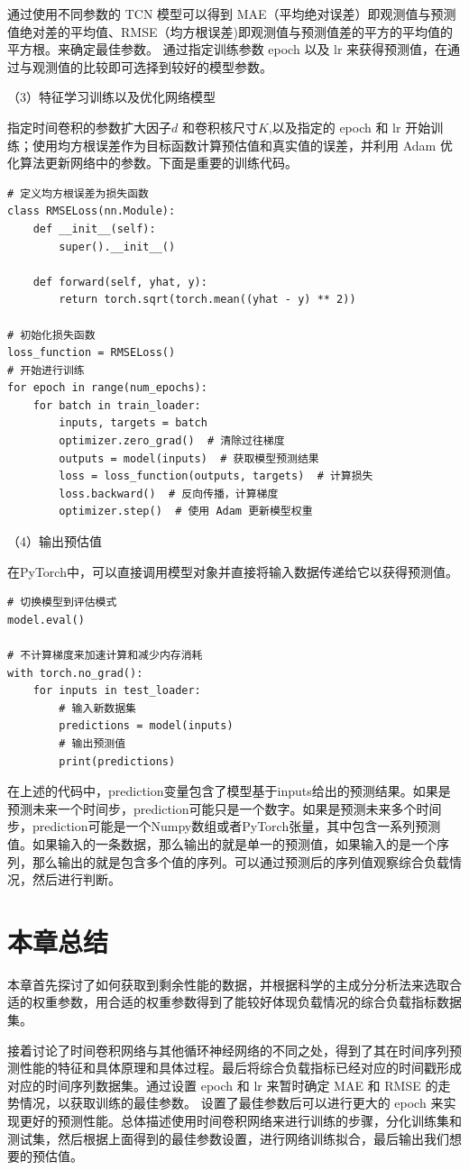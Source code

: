 通过使用不同参数的 TCN 模型可以得到 MAE（平均绝对误差）即观测值与预测值绝对差的平均值、RMSE（均方根误差)即观测值与预测值差的平方的平均值的平方根。来确定最佳参数。 通过指定训练参数 epoch 以及 lr 来获得预测值，在通过与观测值的比较即可选择到较好的模型参数。

（3）特征学习训练以及优化网络模型

指定时间卷积的参数扩大因子$d$ 和卷积核尺寸$K$,以及指定的 epoch 和 lr 开始训练；使用均方根误差作为目标函数计算预估值和真实值的误差，并利用 Adam 优化算法更新网络中的参数\cite{kingma2014adam}。下面是重要的训练代码。

\begin{lstlisting}
# 定义均方根误差为损失函数
class RMSELoss(nn.Module):
    def __init__(self):
        super().__init__()

    def forward(self, yhat, y):
        return torch.sqrt(torch.mean((yhat - y) ** 2))

# 初始化损失函数
loss_function = RMSELoss()
# 开始进行训练
for epoch in range(num_epochs):
    for batch in train_loader:
        inputs, targets = batch
        optimizer.zero_grad()  # 清除过往梯度
        outputs = model(inputs)  # 获取模型预测结果
        loss = loss_function(outputs, targets)  # 计算损失
        loss.backward()  # 反向传播，计算梯度
        optimizer.step()  # 使用 Adam 更新模型权重
\end{lstlisting}

（4）输出预估值

在PyTorch中，可以直接调用模型对象并直接将输入数据传递给它以获得预测值。
\begin{lstlisting}
# 切换模型到评估模式
model.eval()

# 不计算梯度来加速计算和减少内存消耗
with torch.no_grad():
    for inputs in test_loader:
        # 输入新数据集
        predictions = model(inputs)
        # 输出预测值
        print(predictions)
\end{lstlisting}

在上述的代码中，prediction变量包含了模型基于inputs给出的预测结果。如果是预测未来一个时间步，prediction可能只是一个数字。如果是预测未来多个时间步，prediction可能是一个Numpy数组或者PyTorch张量，其中包含一系列预测值。如果输入的一条数据，那么输出的就是单一的预测值，如果输入的是一个序列，那么输出的就是包含多个值的序列。可以通过预测后的序列值观察综合负载情况，然后进行判断。

\section{本章总结}

本章首先探讨了如何获取到剩余性能的数据，并根据科学的主成分分析法来选取合适的权重参数，用合适的权重参数得到了能较好体现负载情况的综合负载指标数据集。

接着讨论了时间卷积网络与其他循环神经网络的不同之处，得到了其在时间序列预测性能的特征和具体原理和具体过程。最后将综合负载指标已经对应的时间戳形成对应的时间序列数据集。通过设置 epoch 和 lr 来暂时确定 MAE 和 RMSE 的走势情况，以获取训练的最佳参数。
设置了最佳参数后可以进行更大的 epoch 来实现更好的预测性能。总体描述使用时间卷积网络来进行训练的步骤，分化训练集和测试集，然后根据上面得到的最佳参数设置，进行网络训练拟合，最后输出我们想要的预估值。
